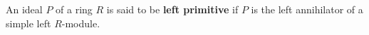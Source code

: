 An ideal $P$ of a ring $R$ is said to be \textbf{left primitive} if $P$ is the left annihilator of a simple left $R$-module.

